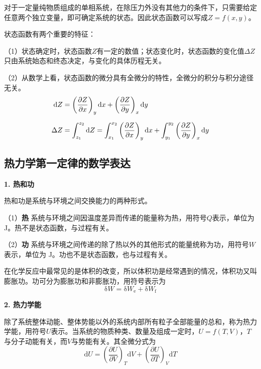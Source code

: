 \documentclass[lang=cn,newtx,10pt,scheme=chinese]{elegantbook}
\begin{document}
对于一定量纯物质组成的单相系统，在除压力外没有其他力的条件下，只需要给定任意两个独立变量，即可确定系统的状态。因此状态函数可以写成$Z=f(x,y)$。

状态函数有两个重要的特征：

（1）状态确定时，状态函数$Z$有一定的数值；状态变化时，状态函数的变化值$\Delta Z$只由系统始态和终态决定，与变化的具体历程无关。

（2）从数学上看，状态函数的微分具有全微分的特性，全微分的积分与积分途径无关。
\begin{equation}
	\begin{aligned}
		\mathrm{d}Z &= \left ( \frac{\partial Z}{\partial x}  \right )_y\mathrm{d}x+ \left ( \frac{\partial Z}{\partial y}  \right )_x\mathrm{d}y \\[1.5ex]
		\Delta Z &= \int_{z_1}^{z_2} \mathrm{d}Z=\int_{x_1}^{x_2}  \left ( \frac{\partial Z}{\partial x}  \right )_y\mathrm{d}x+\int_{y_1}^{y_2}  \left ( \frac{\partial Z}{\partial y}  \right )_x\mathrm{d}y
	\end{aligned} \notag
\end{equation}

\subsection{热力学第一定律的数学表达}

\textbf{1. 热和功}

热和功是系统与环境之间交换能力的两种形式。

（1）\textbf{热} \quad 系统与环境之间因温度差异而传递的能量称为热，用符号$Q$表示，单位为 J。热不是状态函数，与过程有关。

（2）\textbf{功} \quad 系统与环境之间传递的除了热以外的其他形式的能量统称为功，用符号$W$表示，单位为 J。功也不是状态函数，也与过程有关。

在化学反应中最常见的是体积的改变，所以体积功是经常遇到的情况，体积功又叫膨胀功。功可分为膨胀功和非膨胀功，用符号表示为
$$
\mathrm{\delta} W=\mathrm{\delta} W_\mathrm{e} + \mathrm{\delta} W_\mathrm{f}
$$

\textbf{2. 热力学能}

除了系统整体动能、整体势能以外的系统内部所有粒子全部能量的总和，称为热力学能，用符号$U$表示。当系统的物质种类、数量及组成一定时，$U=f(T,V)$，$T$与分子动能有关，而$V$与势能有关。其全微分式为
\begin{equation}
	\mathrm{d}U=\left ( \frac{\partial U}{\partial V}  \right )_T\mathrm{d}V+ \left ( \frac{\partial U}{\partial T}  \right )_V\mathrm{d}T
\end{equation}
\end{document}
